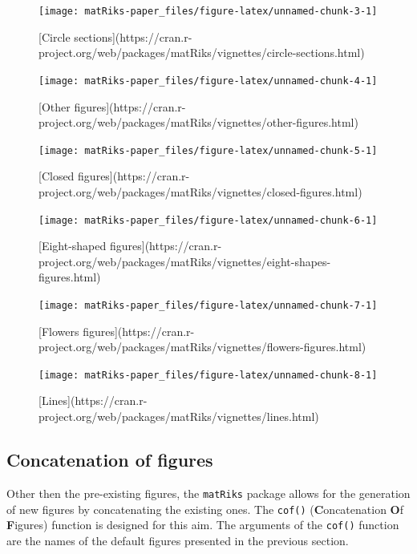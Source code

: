\begin{figure}
\texttt{[image: matRiks-paper\_files/figure-latex/unnamed-chunk-3-1]} \caption{[Circle sections](https://cran.r-project.org/web/packages/matRiks/vignettes/circle-sections.html)}\label{fig:unnamed-chunk-3}
\end{figure}

\begin{figure}
\texttt{[image: matRiks-paper\_files/figure-latex/unnamed-chunk-4-1]} \caption{[Other figures](https://cran.r-project.org/web/packages/matRiks/vignettes/other-figures.html)}\label{fig:unnamed-chunk-4}
\end{figure}

\begin{figure}
\texttt{[image: matRiks-paper\_files/figure-latex/unnamed-chunk-5-1]} \caption{[Closed figures](https://cran.r-project.org/web/packages/matRiks/vignettes/closed-figures.html)}\label{fig:unnamed-chunk-5}
\end{figure}

\begin{figure}
\texttt{[image: matRiks-paper\_files/figure-latex/unnamed-chunk-6-1]} \caption{[Eight-shaped figures](https://cran.r-project.org/web/packages/matRiks/vignettes/eight-shapes-figures.html)}\label{fig:unnamed-chunk-6}
\end{figure}

\begin{figure}
\texttt{[image: matRiks-paper\_files/figure-latex/unnamed-chunk-7-1]} \caption{[Flowers figures](https://cran.r-project.org/web/packages/matRiks/vignettes/flowers-figures.html)}\label{fig:unnamed-chunk-7}
\end{figure}

\begin{figure}
\texttt{[image: matRiks-paper\_files/figure-latex/unnamed-chunk-8-1]} \caption{[Lines](https://cran.r-project.org/web/packages/matRiks/vignettes/lines.html)}\label{fig:unnamed-chunk-8}
\end{figure}

\subsection{Concatenation of figures}\label{concatenation-of-figures}

Other then the pre-existing figures, the \texttt{matRiks} package allows for the generation of new figures by concatenating the existing ones. The \texttt{cof()} (\textbf{C}oncatenation \textbf{O}f \textbf{F}igures) function is designed for this aim. The arguments of the \texttt{cof()} function are the names of the default figures presented in the previous section.


